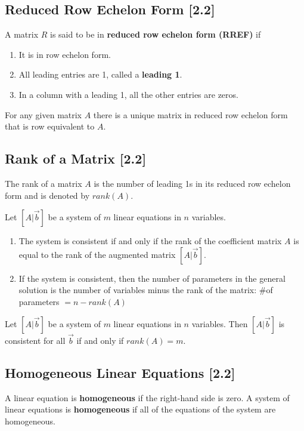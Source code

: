 \documentclass[a4paper,9pt]{extarticle}
\begin{document}
\begin{multicols*}{2}
\subsection{Reduced Row Echelon Form [2.2]}
A matrix $R$ is said to be in \textbf{reduced row echelon form (RREF)} if
\begin{enumerate}[label=\bfseries (\arabic*)] \itemsep0pt \parskip0pt 
    \item It is in row echelon form.
    \item All leading entries are 1, called a \textbf{leading 1}.
    \item In a column with a leading 1, all the other entries are zeros.
\end{enumerate}
For any given matrix $A$ there is a unique matrix in reduced row echelon form that is row equivalent to $A$.


\subsection{Rank of a Matrix [2.2]}
The rank of a matrix $A$ is the number of leading 1s in its reduced row echelon form and is denoted by $rank(A)$.

Let $[A | \vec{b}]$ be a system of $m$ linear equations in $n$ variables.
\begin{enumerate}[label=\bfseries (\arabic*)] \itemsep0pt \parskip0pt 
    \item The system is consistent if and only if the rank of the coefficient matrix $A$ is
equal to the rank of the augmented matrix $[A | \vec{b}]$.
    \item If the system is consistent, then the number of parameters in the general solution is the number of variables minus the rank of the matrix: \#of parameters $= n - rank(A)$
\end{enumerate}

Let $[A | \vec{b}]$ be a system of $m$ linear equations in $n$ variables. Then $[A | \vec{b}]$ is consistent for all $\vec{b}$ if and only if $rank(A) = m$.


\subsection{Homogeneous Linear Equations [2.2]}
A linear equation is \textbf{homogeneous} if the right-hand side is zero. A system of linear equations is \textbf{homogeneous} if all of the equations of the system are homogeneous.


\end{multicols*}
\end{document}
